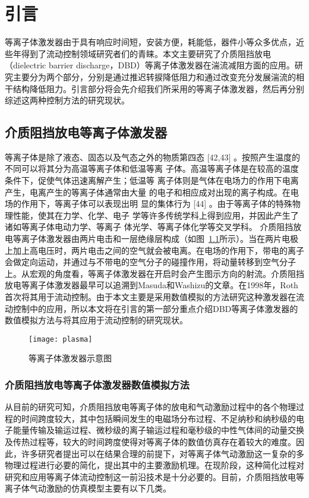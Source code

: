 \chapter{引言}
\label{cha:intro}

等离子体激发器由于具有响应时间短，安装方便，耗能低，器件小等众多优点，近些年得到了流动控制领域研究者们的青睐。本文主要研究了介质阻挡放电（dielectric barrier discharge，DBD）等离子体激发器在湍流减阻方面的应用。研究主要分为两个部分，分别是通过推迟转捩降低阻力和通过改变充分发展湍流的相干结构降低阻力。引言部分将会先介绍我们所采用的等离子体激发器，然后再分别综述这两种控制方法的研究现状。


\section{介质阻挡放电等离子体激发器}

等离子体是除了液态、固态以及气态之外的物质第四态
[42,43]
。按照产生温度的不同可以将其分为高温等离子体和低温等离
子体。高温等离子体是在较高的温度条件下，促使气体迅速离解产生；低温等
离子体则是气体在电场力的作用下电离产生，电离产生的等离子体通常由大量
的电子和相应成对出现的离子构成。在电场的作用下，等离子体可以表现出明
显的集体行为
[44]
。由于等离子体的特殊物理性能，使其在力学、化学、电子
学等许多传统学科上得到应用，并因此产生了诸如等离子体电动力学、等离子
体光学、等离子体化学等交叉学科。
介质阻挡放电等离子体激发器由两片电击和一层绝缘层构成（如图~\ref{fig:SchematicPlasma}所示）。当在两片电极上加上高电压时，两片电击之间的空气就会被电离。在电场的作用下，带电的离子会做定向运动，并通过与不带电的空气分子的碰撞作用，将动量转移到空气分子上。从宏观的角度看，等离子体激发器在开启时会产生图示方向的射流。介质阻挡放电等离子体激发器最早可以追溯到Masuda和Washizu的文章\cite{Masuda1979}。在1998年，Roth首次将其用于流动控制\cite{Roth1998}。由于本文主要是采用数值模拟的方法研究这种激发器在流动控制中的应用，所以本文将在引言的第一部分重点介绍DBD等离子体激发器的数值模拟方法与将其应用于流动控制的研究现状。
\begin{figure}
  \centering
  \texttt{[image: plasma]}
  \caption{等离子体激发器示意图\cite{Whalley2012}}\label{fig:SchematicPlasma}
\end{figure}

\subsection{介质阻挡放电等离子体激发器数值模拟方法}
从目前的研究可知，介质阻挡放电等离子体的放电和气动激励过程中的各个物理过程的时间跨度较大，其中包括瞬间发生的电磁场分布过程、不足纳秒和纳秒级的电子能量传输及输运过程、微秒级的离子输运过程和毫秒级的中性气体间的动量交换及传热过程等，较大的时间跨度使得对等离子体的数值仿真存在着较大的难度。因此，许多研究者提出可以在结果合理的前提下，对等离子体气动激励这一复杂的多物理过程进行必要的简化，提出其中的主要激励机理。在现阶段，这种简化过程对研究和应用等离子体流动控制这一前沿技术是十分必要的。目前，介质阻挡放电等离子体气动激励的仿真模型主要有以下几类。

